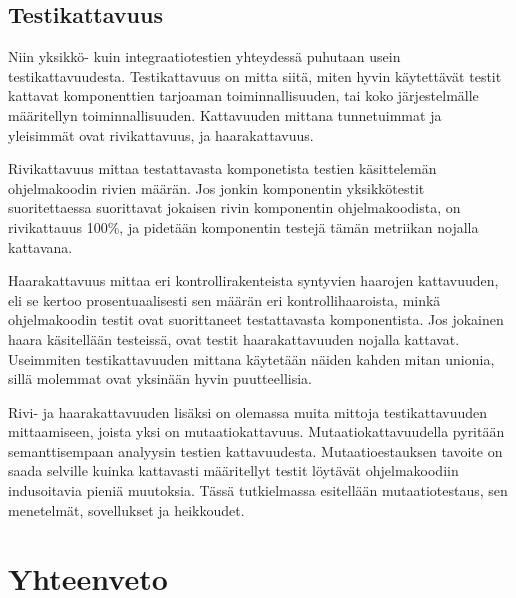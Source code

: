 \documentclass{tktltiki}
\begin{document}
\subsection{Testikattavuus}
Niin yksikkö- kuin integraatiotestien yhteydessä puhutaan usein testikattavuudesta. Testikattavuus on mitta siitä, miten hyvin käytettävät testit kattavat komponenttien tarjoaman toiminnallisuuden, tai koko järjestelmälle määritellyn toiminnallisuuden. Kattavuuden mittana tunnetuimmat ja yleisimmät ovat rivikattavuus, ja haarakattavuus.

Rivikattavuus mittaa testattavasta komponetista testien käsittelemän ohjelmakoodin rivien määrän. Jos jonkin komponentin yksikkötestit suoritettaessa suorittavat jokaisen rivin komponentin ohjelmakoodista, on rivikattauus 100\%, ja pidetään komponentin testejä tämän metriikan nojalla kattavana.

Haarakattavuus mittaa eri kontrollirakenteista syntyvien haarojen kattavuuden, eli se kertoo prosentuaalisesti sen määrän eri kontrollihaaroista, minkä ohjelmakoodin testit ovat suorittaneet testattavasta komponentista. Jos jokainen haara käsitellään testeissä, ovat testit haarakattavuuden nojalla kattavat. Useimmiten testikattavuuden mittana käytetään näiden kahden mitan unionia, sillä molemmat ovat yksinään hyvin puutteellisia.

Rivi- ja haarakattavuuden lisäksi on olemassa muita mittoja testikattavuuden mittaamiseen, joista yksi on mutaatiokattavuus. Mutaatiokattavuudella pyritään semanttisempaan analyysin testien kattavuudesta. Mutaatioestauksen tavoite on saada selville kuinka kattavasti määritellyt testit löytävät ohjelmakoodiin indusoitavia pieniä muutoksia. Tässä tutkielmassa esitellään mutaatiotestaus, sen menetelmät, sovellukset ja heikkoudet.

\section{}

\section{Yhteenveto}
\end{document}
